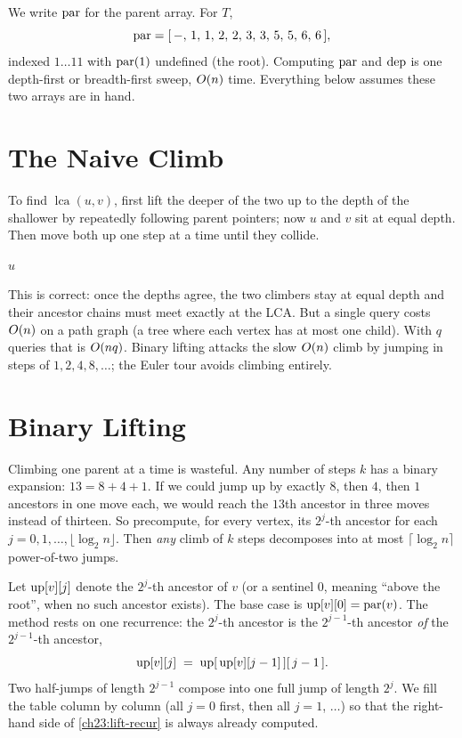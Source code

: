 We write $\operatorname{par}$ for the parent array. For $T$,
\[
\operatorname{par} = [\,-,\,1,\,1,\,2,\,2,\,3,\,3,\,5,\,5,\,6,\,6\,],
\]
indexed $1\ldots 11$ with $\operatorname{par}(1)$ undefined (the root). Computing $\operatorname{par}$ and $\operatorname{dep}$ is one
depth-first or breadth-first sweep, $O(n)$ time. Everything below assumes these two arrays
are in hand.

\section{The Naive Climb}
\label{ch23:naive}

To find $\operatorname{lca}(u,v)$, first lift the
deeper of the two up to the depth of the shallower by repeatedly following parent pointers;
now $u$ and $v$ sit at equal depth. Then move both up one step at a time until they collide.

\begin{algorithm}[H]
\DontPrintSemicolon
\caption{\textsc{NaiveLCA}$(u,v)$ -- climb one step at a time}
\Return $u$\;
\end{algorithm}

This is correct: once the depths agree, the two climbers stay at equal depth and their
ancestor chains must meet exactly at the LCA. But a single query costs $O(n)$ on a path
graph (a tree where each vertex has at most one child). With $q$ queries that is $O(nq)$. Binary lifting attacks the slow $O(n)$ climb by jumping in steps of $1,2,4,8,\dots$; the Euler tour avoids climbing entirely.

\section{Binary Lifting}
\label{ch23:binary-lifting}

\begin{intuitionbox}
Climbing one parent at a time is wasteful. Any number of steps
$k$ has a binary expansion: $13 = 8+4+1$. If we could jump up by exactly $8$, then $4$, then
$1$ ancestors in one move each, we would reach the $13$th ancestor in three moves instead of
thirteen. So precompute, for every vertex, its $2^j$-th ancestor for each
$j=0,1,\dots,\lfloor\log_2 n\rfloor$. Then \emph{any} climb of $k$ steps decomposes into at
most $\lceil\log_2 n\rceil$ power-of-two jumps.
\end{intuitionbox}

Let $\mathrm{up}[v][j]$ denote the $2^j$-th ancestor of $v$ (or a sentinel $0$, meaning ``above the
root'', when no such ancestor exists). The base case is $\mathrm{up}[v][0]=\operatorname{par}(v)$. The method rests on
one recurrence: the $2^j$-th ancestor is the $2^{j-1}$-th ancestor \emph{of} the
$2^{j-1}$-th ancestor,
\begin{equation}
\mathrm{up}[v][j] \;=\; \mathrm{up}[\,\mathrm{up}[v][j-1]\,][\,j-1\,].
\label{ch23:lift-recur}
\end{equation}
Two half-jumps of length $2^{j-1}$ compose into one full jump of length $2^j$. We fill the
table column by column (all $j{=}0$ first, then all $j{=}1$, $\dots$) so that the right-hand
side of \eqref{ch23:lift-recur} is always already computed.

